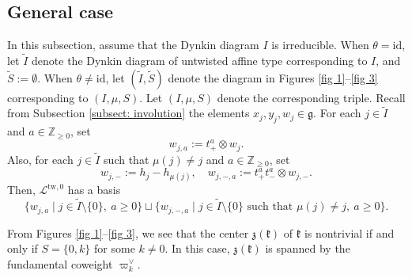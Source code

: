 \documentclass[12pt,a4paper]{amsart}
\theoremstyle{definition}
\numberwithin{equation}{subsection}
\begin{document}
\subsection{General case}
In this subsection, assume that the Dynkin diagram $I$ is irreducible.
When $\theta = \mathrm{id}$, let $\tilde{I}$ denote the Dynkin diagram of untwisted affine type corresponding to $I$, and $\tilde{S} := \emptyset$.
When $\theta \neq \mathrm{id}$, let $(\tilde{I},\tilde{S})$ denote the diagram in Figures \ref{fig 1}--\ref{fig 3} corresponding to $(I,\mu,S)$.
Let $(I,\mu,S)$ denote the corresponding triple.
Recall from Subsection \ref{subsect: involution} the elements $x_j,y_j,w_j \in \mathfrak{g}$.
For each $j \in \tilde{I}$ and $a \in \mathbb{Z}_{\geq 0}$, set
\[
  w_{j,a} := t_+^a \otimes w_j.
\]
Also, for each $j \in \tilde{I}$ such that $\mu(j) \neq j$ and $a \in \mathbb{Z}_{\geq 0}$, set
\[
  w_{j,-} := h_j - h_{\mu(j)}, \quad w_{j,-,a} := t_+^a t_-^a \otimes w_{j,-}.
\]
Then, $\mathcal{L}^{\mathrm{tw},0}$ has a basis
\[
  \{ w_{j,a} \mid j \in \tilde{I} \setminus \{ 0 \}, \ a \geq 0 \} \sqcup \{ w_{j,-,a} \mid j \in \tilde{I} \setminus \{ 0 \} \text{ such that } \mu(j) \neq j, \ a \geq 0 \}.
\]

From Figures \ref{fig 1}--\ref{fig 3}, we see that the center $\mathfrak{z}(\mathfrak{k})$ of $\mathfrak{k}$ is nontrivial if and only if $S = \{ 0,k \}$ for some $k \neq 0$.
In this case, $\mathfrak{z}(\mathfrak{k})$ is spanned by the fundamental coweight $\varpi_k^\vee$.
\end{document}
